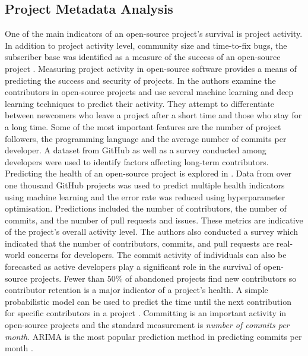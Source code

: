 \documentclass[conference]{IEEEtran}
\begin{document}
\subsection{Project Metadata Analysis}
One of the main indicators of an open-source project's survival is project activity. In addition to project activity level, community size and time-to-fix bugs, the subscriber base was identified as a measure of the success of an open-source project \cite{sen_open_2012}. Measuring project activity in open-source software provides a means of predicting the success and security of projects. In \cite{l_bao_large_2021} the authors examine the contributors in open-source projects and use several machine learning and deep learning techniques to predict their activity. They attempt to differentiate between newcomers who leave a project after a short time and those who stay for a long time. Some of the most important features are the number of project followers, the programming language and the average number of commits per developer. A dataset from GitHub as well as a survey conducted among developers were used to identify factors affecting long-term contributors. Predicting the health of an open-source project is explored in \cite{xia_predicting_2022}. Data from over one thousand GitHub projects was used to predict multiple health indicators using machine learning and the error rate was reduced using hyperparameter optimisation. Predictions included the number of contributors, the number of commits, and the number of pull requests and issues. These metrics are indicative of the project’s overall activity level. The authors also conducted a survey which indicated that the number of contributors, commits, and pull requests are real-world concerns for developers. The commit activity of individuals can also be forecasted as active developers play a significant role in the survival of open-source projects. Fewer than 50\% of abandoned projects find new contributors so contributor retention is a major indicator of a project's health. A simple probabilistic model can be used to predict the time until the next contribution for specific contributors in a project \cite{decan_gap_2020}. Committing is an important activity in open-source projects and the standard measurement is \textit{number of commits per month}. ARIMA is the most popular prediction method in predicting commits per month \cite{chahal_fuzzy_2016}.
\end{document}
